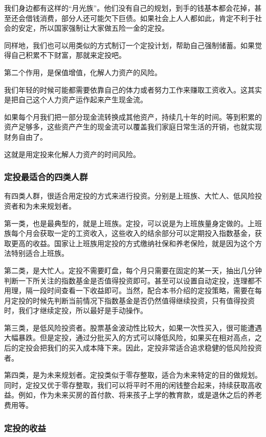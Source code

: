 我们身边都有这样的“月光族”。他们没有自己的规划，到手的钱基本都会花掉，甚至还会借钱消费，部分人还可能欠下巨债。如果社会上人人都如此，肯定不利于社会的安定，所以国家强制让大家做五险一金的定投。

同样地，我们也可以用类似的方式制订一个定投计划，帮助自己强制储蓄。如果觉得自己积累不下财富，那就来定投吧。

第二个作用，是保值增值，化解人力资产的风险。

我们年轻的时候可能都需要依靠自己的体力或者努力工作来赚取工资收入。这其实是把自己这个人力资产运作起来产生现金流。

如果每个月我们把一部分现金流转换成其他资产，持续几十年的时间。等到积累的资产足够多，这些资产产生的现金流可以覆盖我们家庭日常生活的开销，也就实现财务自由了。

这就是用定投来化解人力资产的时间风险。

\subsubsection{定投最适合的四类人群}

有四类人群，很适合用定投的方式来进行投资。分别是上班族、大忙人、低风险投资者和为未来规划者。

第一类，也是最典型的，就是上班族。定投，可以说是为上班族量身定做的。上班族每个月会获取一定的工资收入，这些收入的结余部分可以定期投入指数基金，获取更高的收益。国家让上班族用定投的方式缴纳社保和养老保险，就是因为这个方法特别适合上班族。

第二类，是大忙人。定投不需要盯盘，每个月只需要在固定的某一天，抽出几分钟判断一下所关注的指数基金是否值得投资即可。甚至可以设置自动定投，连理都不用理，隔一段时间查看一下收益即可。当然，配合本书介绍的定投策略，需要在每月定投的时候先判断当前情况下指数基金是否仍然值得继续投资，只有值得投资时，我们才继续定投，所以最好是手动操作。

第三类，是低风险投资者。股票基金波动性比较大，如果一次性买入，很可能遭遇大幅暴跌。但是定投，通过分批买入的方式可以降低风险，如果买在相对高点，之后的定投会把我们的买入成本降下来。因此，定投非常适合追求稳健的低风险投资者。

第四类，是为未来规划者。定投类似于零存整取，适合为未来特定的目的做规划。同时，定投又优于零存整取，我们可以将平时不用的闲钱整合起来，持续获取高收益。例如，作为未来买房的首付款、将来孩子上学的教育款，或是退休之后的养老费用等。

\subsubsection{定投的收益}

